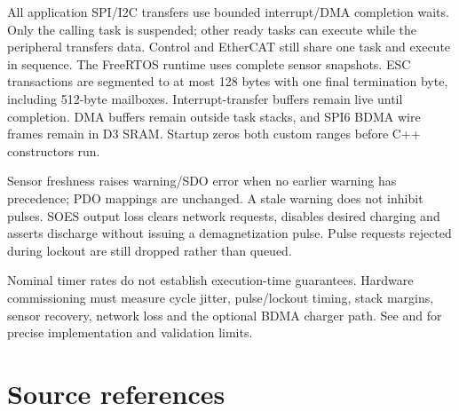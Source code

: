 \documentclass[10pt,a4paper,oneside]{report}
\newcommand{\code}[1]{\texttt{\detokenize{#1}}}
\begin{document}
All application SPI/I2C transfers use bounded interrupt/DMA completion waits.
Only the calling task is suspended; other ready tasks can execute while the
peripheral transfers data. Control and EtherCAT still share one task and execute
in sequence. The FreeRTOS runtime uses complete sensor
snapshots. ESC transactions are segmented to at most 128 bytes with one final
termination byte, including 512-byte mailboxes. Interrupt-transfer buffers
remain live until completion. DMA buffers remain outside task stacks, and
SPI6 BDMA wire frames remain in D3 SRAM. Startup zeros both custom
\code{NOLOAD} ranges before C++ constructors run.

Sensor freshness raises warning/SDO error \code{0xFF19} when no earlier warning
has precedence; PDO mappings are unchanged. A stale warning does not inhibit
pulses. SOES output loss clears network requests, disables desired charging
and asserts discharge without issuing a demagnetization pulse. Pulse requests
rejected during lockout are still dropped rather than queued.

Nominal timer rates do not establish execution-time guarantees. Hardware
commissioning must measure cycle jitter, pulse/lockout timing, stack margins,
sensor recovery, network loss and the optional BDMA charger path. See
 and  for precise implementation
and validation limits.

\appendix
\chapter{Source references}
\end{document}
